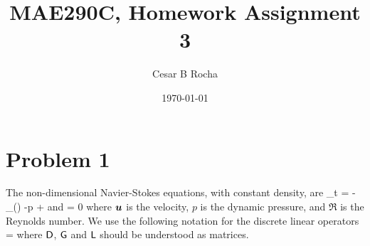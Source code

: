 \documentclass[11pt]{article}
\title{MAE290C, Homework Assignment 3}
\author{Cesar B Rocha}
\date{\today}
\begin{document}

\maketitle

\section*{Problem 1}


The non-dimensional Navier-Stokes equations, with constant density, are
\beq
\label{eq:ns1}
\p_t \bu = - \underbrace{\bu\cdot\nabla\bu}_{ \bN(\bu)}  -\nabla p + \nabla\cdot\nabla\bu\com 
\eeq
and
\beq
\label{eq:ns2}
\nabla\cdot\bu = 0\com
\eeq
where $\boldsymbol{u}$ is the velocity, $p$ is the dynamic pressure, and $\Re$ is the Reynolds number. We use the following
 notation for the discrete linear operators
 \beq
    \sD \approx \nabla\cdot\com\qquad  \sG \approx\nabla \com\qqand\sL =  \sD \sG\com
 \eeq   
 where $\mathsf{D}$, $\mathsf{G}$ and $\mathsf{L}$ should be understood as matrices.
\end{document}
